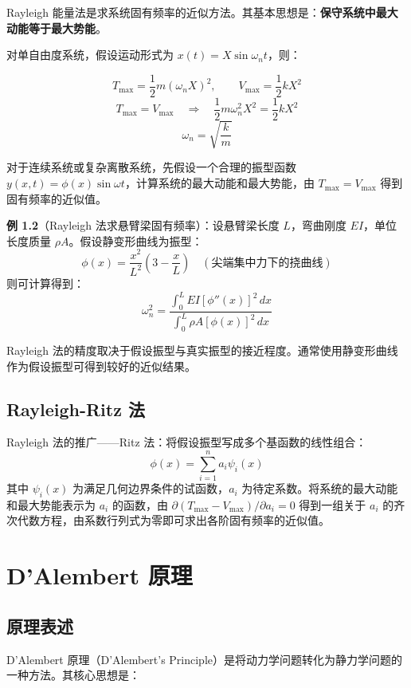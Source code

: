 Rayleigh 能量法是求系统固有频率的近似方法。其基本思想是：\textbf{保守系统中最大动能等于最大势能}。

对单自由度系统，假设运动形式为 $x(t) = X\sin\omega_n t$，则：
\begin{myformula}
    \[
    T_{\max} = \frac{1}{2}m(\omega_n X)^2,\qquad V_{\max} = \frac{1}{2}kX^2
    \]
    \[
    T_{\max} = V_{\max} \quad\Rightarrow\quad \frac{1}{2}m\omega_n^2 X^2 = \frac{1}{2}kX^2
    \]
    \[
    \omega_n = \sqrt{\frac{k}{m}}
    \]
\end{myformula}

对于连续系统或复杂离散系统，先假设一个合理的振型函数 $y(x,t) = \phi(x)\sin\omega t$，计算系统的最大动能和最大势能，由 $T_{\max} = V_{\max}$ 得到固有频率的近似值。

\textbf{例 1.2}（Rayleigh 法求悬臂梁固有频率）：设悬臂梁长度 $L$，弯曲刚度 $EI$，单位长度质量 $\rho A$。假设静变形曲线为振型：
\[
\phi(x) = \frac{x^2}{L^2}\left(3 - \frac{x}{L}\right) \quad (\text{尖端集中力下的挠曲线})
\]
则可计算得到：
\[
\omega_n^2 = \frac{\displaystyle\int_0^L EI[\phi''(x)]^2\,dx}{\displaystyle\int_0^L \rho A[\phi(x)]^2\,dx}
\]

Rayleigh 法的精度取决于假设振型与真实振型的接近程度。通常使用静变形曲线作为假设振型可得到较好的近似结果。

\subsection{Rayleigh-Ritz 法}

Rayleigh 法的推广——Ritz 法：将假设振型写成多个基函数的线性组合：
\[
\phi(x) = \sum_{i=1}^{n} a_i\psi_i(x)
\]
其中 $\psi_i(x)$ 为满足几何边界条件的试函数，$a_i$ 为待定系数。将系统的最大动能和最大势能表示为 $a_i$ 的函数，由 $\partial(T_{\max} - V_{\max})/\partial a_i = 0$ 得到一组关于 $a_i$ 的齐次代数方程，由系数行列式为零即可求出各阶固有频率的近似值。

\section{D'Alembert 原理}

\subsection{原理表述}

D'Alembert 原理（D'Alembert's Principle）是将动力学问题转化为静力学问题的一种方法。其核心思想是：

